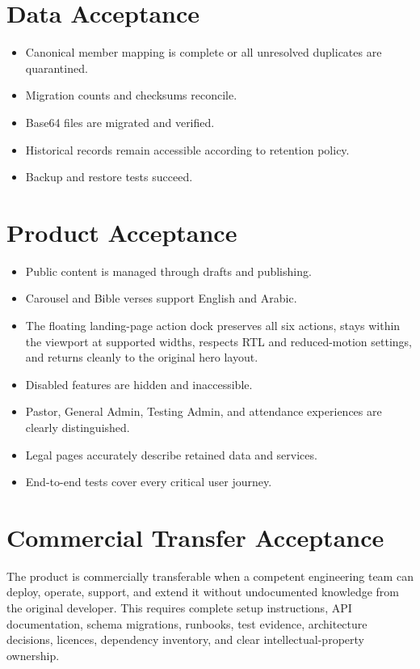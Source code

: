 \documentclass[11pt,a4paper,oneside]{report}
\begin{document}
\section{Data Acceptance}

\begin{itemize}
  \item Canonical member mapping is complete or all unresolved duplicates are quarantined.
  \item Migration counts and checksums reconcile.
  \item Base64 files are migrated and verified.
  \item Historical records remain accessible according to retention policy.
  \item Backup and restore tests succeed.
\end{itemize}

\section{Product Acceptance}

\begin{itemize}
  \item Public content is managed through drafts and publishing.
  \item Carousel and Bible verses support English and Arabic.
  \item The floating landing-page action dock preserves all six actions, stays within the viewport at supported widths, respects RTL and reduced-motion settings, and returns cleanly to the original hero layout.
  \item Disabled features are hidden and inaccessible.
  \item Pastor, General Admin, Testing Admin, and attendance experiences are clearly distinguished.
  \item Legal pages accurately describe retained data and services.
  \item End-to-end tests cover every critical user journey.
\end{itemize}

\section{Commercial Transfer Acceptance}

The product is commercially transferable when a competent engineering team can deploy, operate, support, and extend it without undocumented knowledge from the original developer. This requires complete setup instructions, API documentation, schema migrations, runbooks, test evidence, architecture decisions, licences, dependency inventory, and clear intellectual-property ownership.
\end{document}
